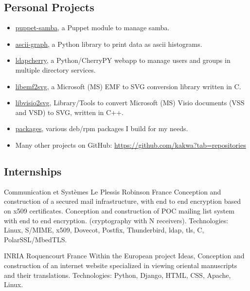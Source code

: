 \documentclass[10pt,a4paper,sans]{moderncv}        %
\begin{document}
\subsection{Personal Projects}
        {}
        {}
        {}
        {
        \begin{itemize}
        \item \href{https://github.com/kakwa/puppet-samba}{puppet-samba}, a Puppet module to manage samba.
        \item \href{https://github.com/kakwa/py-ascii-graph}{ascii-graph}, a Python library to print data as ascii histograms.
        \item \href{https://github.com/kakwa/ldapcherry}{ldapcherry}, a Python/CherryPY webapp to manage users and groups in multiple directory services.
        \item \href{https://github.com/kakwa/libemf2svg}{libemf2svg}, a Microsoft (MS) EMF to SVG conversion library written in C.
        \item \href{https://github.com/kakwa/libvisio2svg}{libvisio2svg}, Library/Tools to convert Microsoft (MS) Visio documents (VSS and VSD) to SVG, written in C++.
        \item \href{https://github.com/kakwa/packages}{packages}, various deb/rpm packages I build for my needs.
        \item Many other projects on GitHub: \url{https://github.com/kakwa?tab=repositories}
        \end{itemize}
        }

\subsection{Internships}

        {Communication et Systèmes}
        {Le Plessis Robinson}
        {France}
        {Conception and construction of a secured mail infrastructure, with end to end encryption
         based on x509 certificates. Conception and construction of POC mailing list system with end to end encryption.
         (cryptography with N receivers).
         \newline Technologies: Linux, S/MIME, x509, Dovecot, Postfix, Thunderbird, ldap, tls, C, PolarSSL/MbedTLS.
        }

        {INRIA}
        {Roquencourt}
        {France}
        {Within the European project Ideas, Conception and construction of an
         internet website specialized in viewing oriental manuscripts and their
         translations.
           \newline Technologies: Python, Django, HTML, CSS, Apache, Linux.
        }
\end{document}
